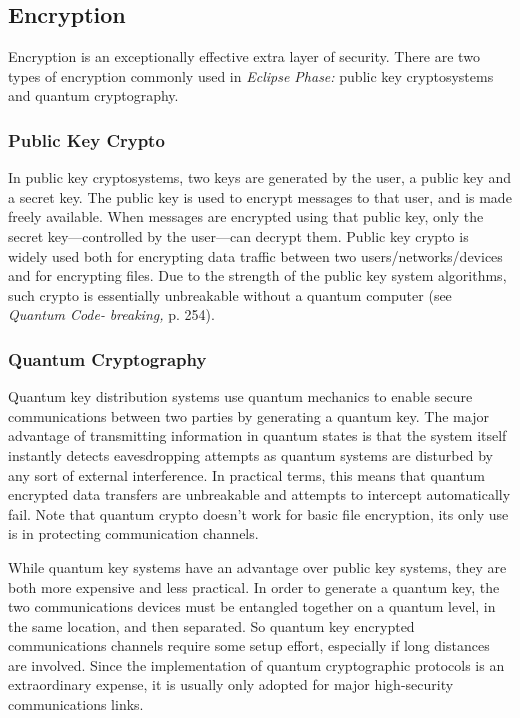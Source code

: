 \subsection{Encryption}

Encryption is an exceptionally effective extra layer of 
security. There are two types of encryption commonly 
used in \textit{Eclipse Phase:} public key cryptosystems and 
quantum cryptography.

\subsubsection{Public Key Crypto}

In public key cryptosystems, two keys are generated 
by the user, a public key and a secret key. The public 
key is used to encrypt messages to that user, and is 
made freely available. When messages are encrypted 
using that public key, only the secret key—controlled 
by the user—can decrypt them. Public key crypto is 
widely used both for encrypting data traffic between 
two users/networks/devices and for encrypting 
files. Due to the strength of the public key system 
algorithms, such crypto is essentially unbreakable 
without a quantum computer (see \textit{Quantum Code-}
\textit{breaking,} p. 254).

\subsubsection{Quantum Cryptography}

Quantum key distribution systems use quantum mechanics
to enable secure communications between two
parties by generating a quantum key. The major advantage
of transmitting information in quantum states is
that the system itself instantly detects eavesdropping 
attempts as quantum systems are disturbed by any sort 
of external interference. In practical terms, this means 
that quantum encrypted data transfers are unbreakable 
and attempts to intercept automatically fail. Note that 
quantum crypto doesn't work for basic file encryption, 
its only use is in protecting communication channels.

While quantum key systems have an advantage over 
public key systems, they are both more expensive and 
less practical. In order to generate a quantum key, 
the two communications devices must be entangled 
together on a quantum level, in the same location, 
and then separated. So quantum key encrypted 
communications channels require some setup effort, 
especially if long distances are involved. Since the 
implementation of quantum cryptographic protocols 
is an extraordinary expense, it is usually only adopted 
for major high-security communications links.

